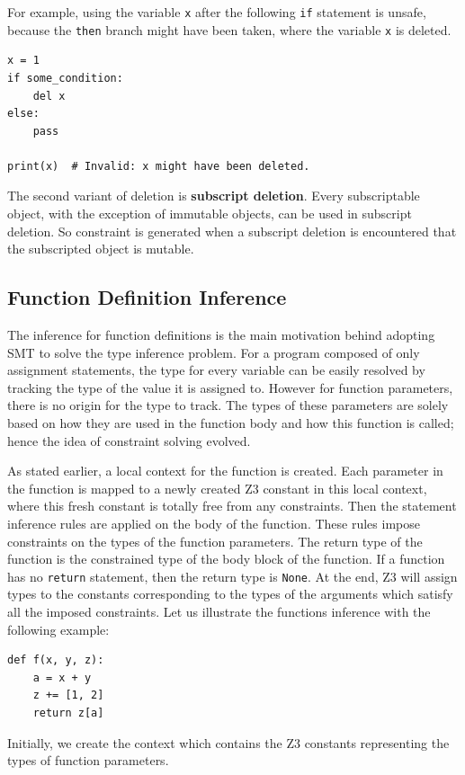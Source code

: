 For example, using the variable \lstinline|x| after the following \lstinline|if| statement is unsafe, because the \lstinline|then| branch might have been taken, where the variable \lstinline|x| is deleted.
\begin{lstlisting}
x = 1
if some_condition:
	del x
else:
	pass
	
print(x)  # Invalid: x might have been deleted.
\end{lstlisting}

The second variant of deletion is \textbf{subscript deletion}. Every subscriptable object, with the exception of immutable objects, can be used in subscript deletion. So constraint is generated when a subscript deletion is encountered that the subscripted object is mutable.
\subsection{Function Definition Inference}\label{func}
The inference for function definitions is the main motivation behind adopting SMT to solve the type inference problem. For a program composed of only assignment statements, the type for every variable can be easily resolved by tracking the type of the value it is assigned to. However for function parameters, there is no origin for the type to track. The types of these parameters are solely based on how they are used in the function body and how this function is called; hence the idea of constraint solving evolved.

As stated earlier, a local context for the function is created. Each parameter in the function is mapped to a newly created Z3 constant in this local context, where this fresh constant is totally free from any constraints. Then the statement inference rules are applied on the body of the function. These rules impose constraints on the types of the function parameters. The return type of the function is the constrained type of the body block of the function. If a function has no \lstinline|return| statement, then the return type is \lstinline|None|. At the end, Z3 will assign types to the constants corresponding to the types of the arguments which satisfy all the imposed constraints. Let us illustrate the functions inference with the following example:
\begin{lstlisting}
def f(x, y, z):
	a = x + y
	z += [1, 2]
	return z[a]	
\end{lstlisting}
Initially, we create the context which contains the Z3 constants representing the types of function parameters.


